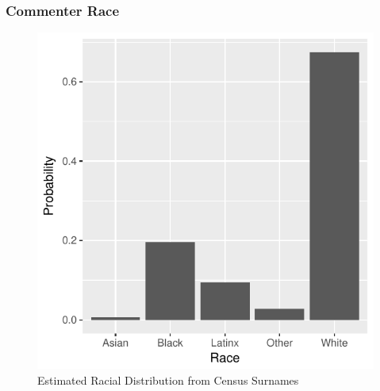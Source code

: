 \documentclass[10pt]{beamer}
\begin{document}
\begin{frame}
\frametitle{Commenter Race}
\begin{figure}
\caption{Estimated Racial Distribution from Census Surnames}
\includegraphics[width = \textwidth/2]{race_prob.pdf}
\end{figure}
\end{frame}
\end{document}
